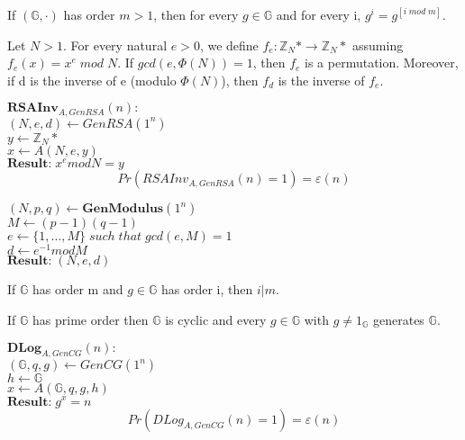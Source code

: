\documentclass[../main]{subfiles}
\begin{document}
\begin{corollary}
	If $(\mathbb{G}, \cdot)$ has order $m > 1$, then for every $g \in{} \mathbb{G}$ and for every i, $g^i = g^{[i \; mod \; m]}$.
\end{corollary}

\begin{theorem}
	Let $N > 1$. For every natural $e > 0$, we define $f_e : \mathbb{Z}_N* \rightarrow{} \mathbb{Z}_N*$ assuming $f_e (x) = x^e \; mod \; N$.
	If $gcd(e, \Phi (N)) = 1$, then $f_e$ is a permutation. Moreover, if d is the inverse of e (modulo $\Phi (N)$), then $f_d$ is the inverse of $f_e$.
\end{theorem}

\noindent
$\textbf{RSAInv}_{A, GenRSA}(n):$\\
$(N, e, d) \leftarrow{} GenRSA(1^n)$\\
$y \leftarrow{} \mathbb{Z}_N*$\\
$x \leftarrow{} A(N, e, y)$\\
$\textbf{Result:} \; x^e mod N = y$
$$Pr(RSAInv_{A, GenRSA}(n) = 1) = \varepsilon{} (n)$$

\noindent
$(N, p, q) \leftarrow{} \textbf{GenModulus}(1^n)$\\
$M \leftarrow{} (p-1)(q-1)$\\
$e \leftarrow{} \{1, \ldots, M\} \; such \; that \; gcd(e, M) = 1$\\
$d \leftarrow{} e^{-1} mod M$\\
$\textbf{Result:} \; (N, e, d)$

\begin{lemma}
	If $\mathbb{G}$ has order m and $g \in{} \mathbb{G}$ has order i, then $i|m$.
\end{lemma}

\begin{theorem}
	If $\mathbb{G}$ has prime order then $\mathbb{G}$ is cyclic and every $g \in{} \mathbb{G}$ with $g \neq{} 1_{\mathbb{G}}$ generates $\mathbb{G}.$
\end{theorem}

\noindent
$\textbf{DLog}_{A, GenCG} (n):$\\
$(\mathbb{G}, q, g) \leftarrow{} GenCG(1^n)$\\
$h \leftarrow{} \mathbb{G}$\\
$x \leftarrow{} A(\mathbb{G}, q, g, h)$\\
$\textbf{Result:} \; g^x  =    n $
$$Pr(DLog_{A, GenCG} (n) = 1) = \varepsilon{} (n)$$

\end{document}
